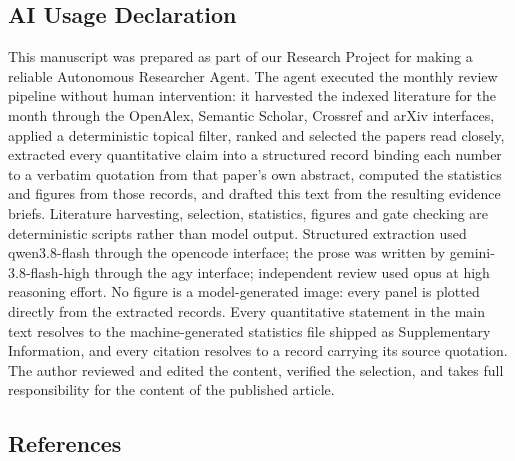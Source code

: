 \documentclass[
  11pt,
]{article}
\begin{document}
\subsection{AI Usage Declaration}\label{ai-usage-declaration}

This manuscript was prepared as part of our Research Project for making
a reliable Autonomous Researcher Agent. The agent executed the monthly
review pipeline without human intervention: it harvested the indexed
literature for the month through the OpenAlex, Semantic Scholar,
Crossref and arXiv interfaces, applied a deterministic topical filter,
ranked and selected the papers read closely, extracted every
quantitative claim into a structured record binding each number to a
verbatim quotation from that paper's own abstract, computed the
statistics and figures from those records, and drafted this text from
the resulting evidence briefs. Literature harvesting, selection,
statistics, figures and gate checking are deterministic scripts rather
than model output. Structured extraction used qwen3.8-flash through the
opencode interface; the prose was written by gemini-3.8-flash-high
through the agy interface; independent review used opus at high
reasoning effort. No figure is a model-generated image: every panel is
plotted directly from the extracted records. Every quantitative
statement in the main text resolves to the machine-generated statistics
file shipped as Supplementary Information, and every citation resolves
to a record carrying its source quotation. The author reviewed and
edited the content, verified the selection, and takes full
responsibility for the content of the published article.

\subsection{References}\label{references}
\end{document}
